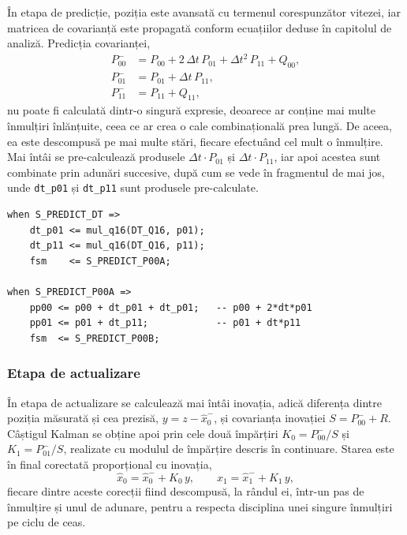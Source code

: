 În etapa de predicție, poziția este avansată cu termenul corespunzător vitezei, iar
matricea de covarianță este propagată conform ecuațiilor deduse în capitolul de
analiză. Predicția covarianței,
%
\begin{align*}
P_{00}^{-} &= P_{00} + 2\,\Delta t\,P_{01} + \Delta t^2\,P_{11} + Q_{00}, \\
P_{01}^{-} &= P_{01} + \Delta t\,P_{11}, \\
P_{11}^{-} &= P_{11} + Q_{11},
\end{align*}
%
nu poate fi calculată dintr-o singură expresie, deoarece ar conține mai multe
înmulțiri înlănțuite, ceea ce ar crea o cale combinațională prea lungă. De aceea, ea
este descompusă pe mai multe stări, fiecare efectuând cel mult o înmulțire. Mai întâi
se pre-calculează produsele $\Delta t \cdot P_{01}$ și $\Delta t \cdot P_{11}$, iar
apoi acestea sunt combinate prin adunări succesive, după cum se vede în fragmentul de
mai jos, unde \texttt{dt\_p01} și \texttt{dt\_p11} sunt produsele pre-calculate.

\begin{lstlisting}[caption={Predicția covarianței, descompusă pe stări.},label={lst:predict-p}]
when S_PREDICT_DT =>
    dt_p01 <= mul_q16(DT_Q16, p01);
    dt_p11 <= mul_q16(DT_Q16, p11);
    fsm    <= S_PREDICT_P00A;

when S_PREDICT_P00A =>
    pp00 <= p00 + dt_p01 + dt_p01;   -- p00 + 2*dt*p01
    pp01 <= p01 + dt_p11;            -- p01 + dt*p11
    fsm  <= S_PREDICT_P00B;
\end{lstlisting}

\subsubsection{Etapa de actualizare}

În etapa de actualizare se calculează mai întâi inovația, adică diferența dintre
poziția măsurată și cea prezisă, $y = z - \hat{x}_0^{-}$, și covarianța inovației
$S = P_{00}^{-} + R$. Câștigul Kalman se obține apoi prin cele două împărțiri
$K_0 = P_{00}^{-}/S$ și $K_1 = P_{01}^{-}/S$, realizate cu modulul de împărțire
descris în continuare. Starea este în final corectată proporțional cu inovația,
%
\begin{equation*}
\hat{x}_0 = \hat{x}_0^{-} + K_0\,y, \qquad \hat{x}_1 = \hat{x}_1^{-} + K_1\,y,
\end{equation*}
%
fiecare dintre aceste corecții fiind descompusă, la rândul ei, într-un pas de
înmulțire și unul de adunare, pentru a respecta disciplina unei singure înmulțiri pe
ciclu de ceas.

